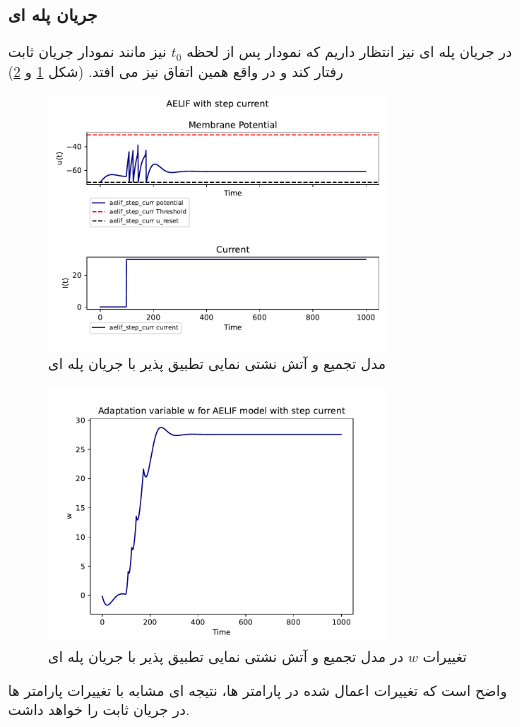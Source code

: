 \documentclass{article}
\begin{document}
            \subsubsection*{جریان پله ای}
                در جریان پله ای نیز انتظار داریم که نمودار پس از لحظه 
                $t_0$ 
                نیز مانند نمودار جریان ثابت رفتار کند و در واقع همین اتفاق نیز می افتد.
                (شکل \ref{fig:aelif-step-curr} و
                \ref{fig:aelif-w-step-curr})
                \begin{figure}[H]
                    \centering
                    \includegraphics[width=0.8\textwidth]{plots/AELIF with step current.pdf} 
                    \caption{مدل تجمیع و آتش نشتی نمایی تطبیق پذیر با جریان پله ای}
                    \label{fig:aelif-step-curr}
                \end{figure}
                \begin{figure}[H]
                    \centering
                    \includegraphics[width=0.8\textwidth]{plots/Adaptation variable w for AELIF model with step current.pdf} 
                    \caption{تغییرات $w$ در مدل تجمیع و آتش نشتی نمایی تطبیق پذیر با جریان پله ای}
                    \label{fig:aelif-w-step-curr}
                \end{figure}
                واضح است که تغییرات اعمال شده در پارامتر ها، نتیجه ای مشابه با تغییرات پارامتر ها در جریان ثابت را خواهد داشت.
\end{document}
